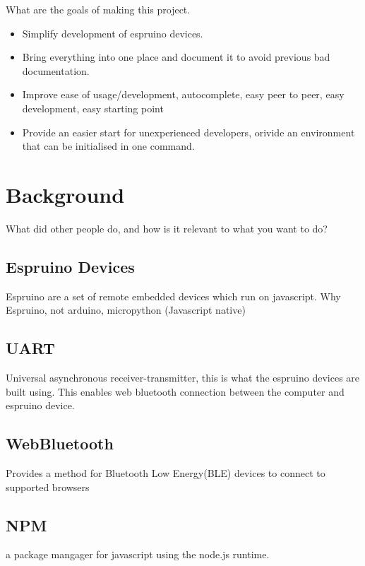 \documentclass{l4proj}
\begin{document}
What are the goals of making this project.

\begin{itemize}
    \item
    Simplify development of espruino devices.
    \item
    Bring everything into one place and document it to avoid previous bad documentation.
    \item
    Improve ease of usage/development, autocomplete, easy peer to peer, easy development, easy starting point
    \item
    Provide an easier start for unexperienced developers, orivide an environment that can be initialised in one command.
\end{itemize}



\chapter{Background}
What did other people do, and how is it relevant to what you want to do?
\section{Espruino Devices}
\text    
    Espruino are a set of remote embedded devices which run on javascript. Why Espruino, not arduino, micropython (Javascript native)
    
\section{UART}
\text Universal asynchronous receiver-transmitter, this is what the espruino devices are built using. This enables web bluetooth connection between the computer and espruino device.

\section{WebBluetooth}
\text Provides a method for Bluetooth Low Energy(BLE) devices to connect to supported browsers

\section{NPM}
\text a package mangager for javascript using the node.js runtime.
\end{document}
